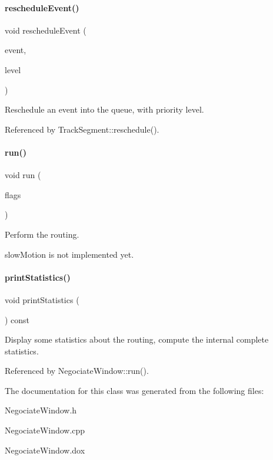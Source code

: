 \paragraph{\texorpdfstring{reschedule\+Event()}{rescheduleEvent()}}
{\footnotesize\ttfamily void reschedule\+Event (\begin{DoxyParamCaption}\item[{\mbox{\hyperlink{classKite_1_1RoutingEvent}{Routing\+Event}} $\ast$}]{event,  }\item[{unsigned int}]{level }\end{DoxyParamCaption})\hspace{0.3cm}{\ttfamily [inline]}}

Reschedule an event into the queue, with priority {\ttfamily level}. 

Referenced by Track\+Segment\+::reschedule().

\mbox{\label{classKite_1_1NegociateWindow_a61e848b73b597f54e2e83e13eb70ff83}} 
\paragraph{\texorpdfstring{run()}{run()}}
{\footnotesize\ttfamily void run (\begin{DoxyParamCaption}\item[{unsigned int}]{flags }\end{DoxyParamCaption})}

Perform the routing.

{\ttfamily slow\+Motion} is not implemented yet. \mbox{\label{classKite_1_1NegociateWindow_a8d3dfaa30cedabd6b64977827ac989d8}} 
\paragraph{\texorpdfstring{print\+Statistics()}{printStatistics()}}
{\footnotesize\ttfamily void print\+Statistics (\begin{DoxyParamCaption}{ }\end{DoxyParamCaption}) const}

Display some statistics about the routing, compute the internal complete statistics. 

Referenced by Negociate\+Window\+::run().



The documentation for this class was generated from the following files\+:\begin{DoxyCompactItemize}
\item 
Negociate\+Window.\+h\item 
Negociate\+Window.\+cpp\item 
Negociate\+Window.\+dox\end{DoxyCompactItemize}
